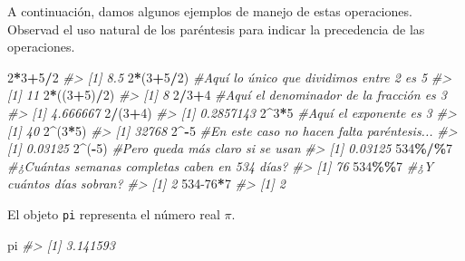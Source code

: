 \documentclass[
]{book}
\newenvironment{Shaded}{\begin{snugshade}}{\end{snugshade}}
\newcommand{\CommentTok}[1]{\textcolor[rgb]{0.56,0.35,0.01}{\textit{#1}}}
\newcommand{\DecValTok}[1]{\textcolor[rgb]{0.00,0.00,0.81}{#1}}
\newcommand{\NormalTok}[1]{#1}
\newcommand{\OperatorTok}[1]{\textcolor[rgb]{0.81,0.36,0.00}{\textbf{#1}}}
\theoremstyle{definition}
\theoremstyle{definition}
\theoremstyle{definition}
\theoremstyle{remark}
\begin{document}
A continuación, damos algunos ejemplos de manejo de estas operaciones. Observad el uso natural de los paréntesis para indicar la precedencia de las operaciones.

\begin{Shaded}
\begin{Highlighting}[]
\DecValTok{2}\OperatorTok{*}\DecValTok{3}\OperatorTok{+}\DecValTok{5}\OperatorTok{/}\DecValTok{2}
\CommentTok{\#\textgreater{} [1] 8.5}
\DecValTok{2}\OperatorTok{*}\NormalTok{(}\DecValTok{3}\OperatorTok{+}\DecValTok{5}\OperatorTok{/}\DecValTok{2}\NormalTok{) }\CommentTok{\#Aquí lo único que dividimos entre 2 es 5}
\CommentTok{\#\textgreater{} [1] 11}
\DecValTok{2}\OperatorTok{*}\NormalTok{((}\DecValTok{3}\OperatorTok{+}\DecValTok{5}\NormalTok{)}\OperatorTok{/}\DecValTok{2}\NormalTok{)}
\CommentTok{\#\textgreater{} [1] 8}
\DecValTok{2}\OperatorTok{/}\DecValTok{3}\OperatorTok{+}\DecValTok{4} \CommentTok{\#Aquí el denominador de la fracción es 3}
\CommentTok{\#\textgreater{} [1] 4.666667}
\DecValTok{2}\OperatorTok{/}\NormalTok{(}\DecValTok{3}\OperatorTok{+}\DecValTok{4}\NormalTok{)}
\CommentTok{\#\textgreater{} [1] 0.2857143}
\DecValTok{2}\OperatorTok{\^{}}\DecValTok{3}\OperatorTok{*}\DecValTok{5} \CommentTok{\#Aquí el exponente es 3}
\CommentTok{\#\textgreater{} [1] 40}
\DecValTok{2}\OperatorTok{\^{}}\NormalTok{(}\DecValTok{3}\OperatorTok{*}\DecValTok{5}\NormalTok{)}
\CommentTok{\#\textgreater{} [1] 32768}
\DecValTok{2}\OperatorTok{\^{}{-}}\DecValTok{5}  \CommentTok{\#En este caso no hacen falta paréntesis...}
\CommentTok{\#\textgreater{} [1] 0.03125}
\DecValTok{2}\OperatorTok{\^{}}\NormalTok{(}\OperatorTok{{-}}\DecValTok{5}\NormalTok{) }\CommentTok{\#Pero queda más claro si se usan}
\CommentTok{\#\textgreater{} [1] 0.03125}
\DecValTok{534}\OperatorTok{\%/\%}\DecValTok{7} \CommentTok{\#¿Cuántas semanas completas caben en 534 días?}
\CommentTok{\#\textgreater{} [1] 76}
\DecValTok{534}\OperatorTok{\%\%}\DecValTok{7} \CommentTok{\#¿Y cuántos días sobran? }
\CommentTok{\#\textgreater{} [1] 2}
\DecValTok{534{-}76}\OperatorTok{*}\DecValTok{7}
\CommentTok{\#\textgreater{} [1] 2}
\end{Highlighting}
\end{Shaded}

El objeto \texttt{pi} representa el número real \(\pi\).

\begin{Shaded}
\begin{Highlighting}[]
\NormalTok{pi}
\CommentTok{\#\textgreater{} [1] 3.141593}
\end{Highlighting}
\end{Shaded}
\end{document}
